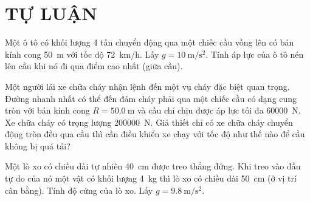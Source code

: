 \section{TỰ LUẬN}
\setcounter{ex}{0}

\begin{ex}
	Một ô tô có khối lượng 4 tấn chuyển động qua một chiếc cầu vồng lên có bán kính cong \SI{50}{\meter} với tốc độ \SI{72}{\kilo\meter/\hour}. Lấy $g=\SI{10}{\meter/\second^2}$. Tính áp lực của ô tô nén lên cầu khi nó đi qua điểm cao nhất (giữa cầu).
	\loigiai{
		
	}
\end{ex}
\begin{ex}
	Một người lái xe chữa cháy nhận lệnh đến một vụ cháy đặc biệt quan trọng. Đường nhanh nhất có thể đến đám cháy phải qua một chiếc cầu có dạng cung tròn với bán kính cong $R=\SI{50.0}{\meter}$ và cầu chỉ chịu được áp lực tối đa \SI{60000}{\newton}. Xe chữa cháy có trọng lượng \SI{200000}{\newton}. Giả thiết chỉ có xe chữa cháy chuyển động tròn đều qua cầu thì cần điều khiển xe chạy với tốc độ như thế nào để cầu không bị quá tải?
	\loigiai{
		
	}
\end{ex}
\begin{ex}
	Một lò xo có chiều dài tự nhiên \SI{40}{\centi\meter} được treo thẳng đứng. Khi treo vào đầu tự do của nó một vật có khối lượng \SI{4}{\kilogram} thì lò xo có chiều dài \SI{50}{\centi\meter} (ở vị trí cân bằng). Tính độ cứng của lò xo. Lấy $g=\SI{9.8}{\meter/\second^2}$.
	\loigiai{
		
	}
\end{ex}
